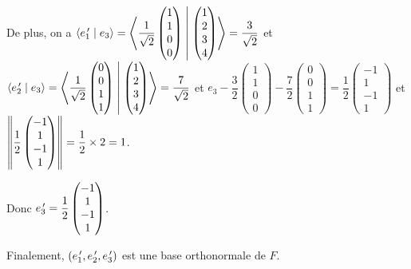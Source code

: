 \begin{corr}[1]
De plus, on a \(\left\langle e_1^{\,\prime}\;\middle|\; e_3\right\rangle=\left\langle\dfrac{1}{\sqrt{2}}\begin{pmatrix}
1 \\ 1 \\ 0 \\ 0
\end{pmatrix}\;\middle|\;\begin{pmatrix}
1 \\ 2 \\ 3 \\ 4
\end{pmatrix}\right\rangle=\dfrac{3}{\sqrt{2}}\) et \(\left\langle e_2^{\,\prime}\;\middle|\; e_3\right\rangle=\left\langle\dfrac{1}{\sqrt{2}}\begin{pmatrix}
0 \\ 0 \\ 1 \\ 1
\end{pmatrix}\;\middle|\;\begin{pmatrix}
1 \\ 2 \\ 3 \\ 4
\end{pmatrix}\right\rangle=\dfrac{7}{\sqrt{2}}\) et \(e_3-\dfrac{3}{2}\begin{pmatrix}
1 \\ 1 \\ 0 \\ 0
\end{pmatrix}-\dfrac{7}{2}\begin{pmatrix}
0 \\ 0 \\ 1 \\ 1
\end{pmatrix}=\dfrac{1}{2}\begin{pmatrix}
-1 \\ 1 \\ -1 \\ 1
\end{pmatrix}\) et \(\left\|\dfrac{1}{2}\begin{pmatrix}
-1 \\ 1 \\ -1 \\ 1
\end{pmatrix}\right\|=\dfrac{1}{2}\times2=1\).

Donc \(e_3^{\,\prime}=\dfrac{1}{2}\begin{pmatrix}
-1 \\ 1 \\ -1 \\ 1
\end{pmatrix}\).

Finalement, \(\left(e_1^{\,\prime},e_2^{\,\prime},e_3^{\,\prime}\right)\) est une base orthonormale de \(F\).
\end{corr}

